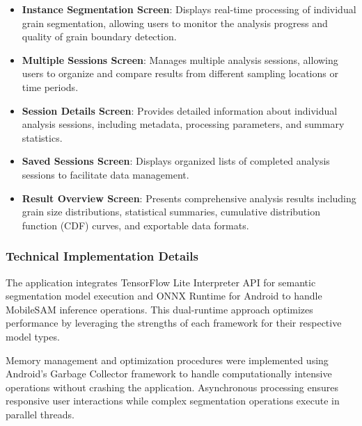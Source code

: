\documentclass[final-report]{report-template}
\begin{document}
\begin{itemize}
    \item \textbf{Instance Segmentation Screen}: Displays real-time processing of individual grain segmentation, allowing users to monitor the analysis progress and quality of grain boundary detection.
\end{itemize}
\begin{itemize}
    \item \textbf{Multiple Sessions Screen}: Manages multiple analysis sessions, allowing users to organize and compare results from different sampling locations or time periods.
\end{itemize}
\begin{itemize}
    \item \textbf{Session Details Screen}: Provides detailed information about individual analysis sessions, including metadata, processing parameters, and summary statistics.
\end{itemize}
\begin{itemize}
    \item \textbf{ Saved Sessions Screen}: Displays organized lists of completed analysis sessions to facilitate data management.
\end{itemize}
\begin{itemize}
    \item \textbf{Result Overview Screen}: Presents comprehensive analysis results including grain size distributions, statistical summaries, cumulative distribution function (CDF) curves, and exportable data formats.
\end{itemize}

\subsubsection{Technical Implementation Details}
The application integrates TensorFlow Lite Interpreter API for semantic segmentation model execution and ONNX Runtime for Android to handle MobileSAM inference operations. This dual-runtime approach optimizes performance by leveraging the strengths of each framework for their respective model types.

Memory management and optimization procedures were implemented using Android's Garbage Collector framework to handle computationally intensive operations without crashing the application. Asynchronous processing ensures responsive user interactions while complex segmentation operations execute in parallel threads.
\end{document}
